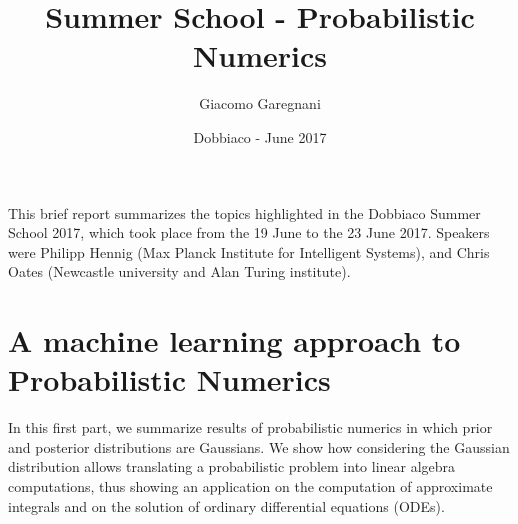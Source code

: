 \documentclass{scrartcl}
\title{Summer School - Probabilistic Numerics}
\author{Giacomo Garegnani}
\date{Dobbiaco - June 2017}
\theoremstyle{definition}
\theoremstyle{remark}
\numberwithin{definition}{section}
\numberwithin{remark}{section}
\begin{document}
\maketitle

This brief report summarizes the topics highlighted in the Dobbiaco Summer School 2017, which took place from the 19 June to the 23 June 2017. Speakers were Philipp Hennig (Max Planck Institute for Intelligent Systems), and Chris Oates (Newcastle university and Alan Turing institute).

\section{A machine learning approach to Probabilistic Numerics}

In this first part, we summarize results of probabilistic numerics in which prior and posterior distributions are Gaussians. We show how considering the Gaussian distribution allows translating a probabilistic problem into linear algebra computations, thus showing an application on the computation of approximate integrals and on the solution of ordinary differential equations (ODEs).
\end{document}
